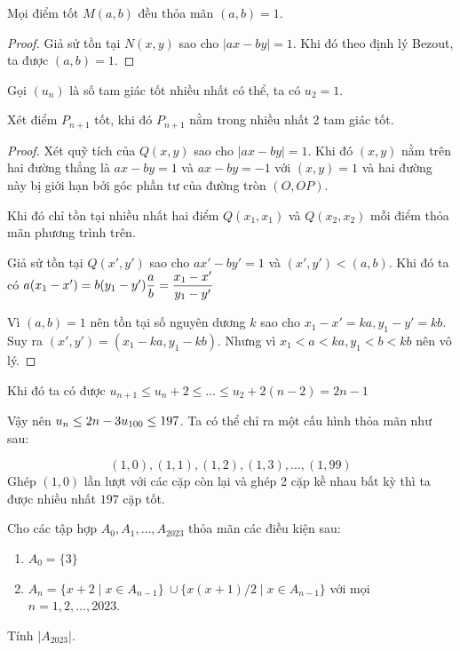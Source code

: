 \documentclass[11pt]{scrartcl}
\begin{document}
\begin{itemize}[label=, leftmargin=0em, itemsep=0.5em]
\begin{sol}
            Mọi điểm tốt $M(a,b)$ đều thỏa mãn $(a,b) =1$.

        \begin{proof}
            Giả sử tồn tại $N(x,y)$ sao cho $|ax - by| = 1$. Khi đó theo định lý Bezout, ta được $(a,b) = 1$.
        \end{proof}
        Gọi $(u_n)$ là số tam giác tốt nhiều nhất có thể, ta có $u_2 = 1$. 

        
         Xét điểm $P_{n + 1}$ tốt, khi đó $P_{n + 1}$ nằm trong nhiều nhất 2 tam giác tốt.

        \begin{proof}
            Xét quỹ tích của $Q(x,y)$ sao cho $|ax - by| = 1$. Khi đó $(x,y)$ nằm trên hai đường thẳng là $ax - by = 1$ và $ax - by = -1$ với $(x,y) = 1$ và hai đường này bị giới hạn bởi góc phần tư của đường tròn $(O,OP)$. 
            
            Khi đó chỉ tồn tại nhiều nhất hai điểm $Q(x_1,x_1)$ và $Q(x_2,x_2)$ mỗi điểm thỏa mãn phương trình trên. 

            Giả sử tồn tại $Q(x',y')$ sao cho $ax' - by' = 1$ và $(x',y') < (a,b)$. Khi đó ta có $a(x_1 - x') = b(y_1 - y') \lra \frac{a}{b} = \frac{x_1 - x'}{y_1 - y'}$

            Vì $(a,b) = 1$ nên tồn tại số nguyên dương $k$ sao cho $x_1 - x' = ka, y_1 - y' = kb$. Suy ra $(x',y') = (x_1 - ka, y_1 - kb)$. Nhưng vì $x_1 < a<  ka, y_1 < b< kb$ nên vô lý. 
        \end{proof}
        Khi đó ta có được $u_{n + 1} \leq u_n + 2 \leq \dots \leq u_2 + 2(n - 2)  = 2n - 1$

        Vậy nên $u_n \leq 2n - 3 \ra u_{100} \leq 197$. Ta có thể chỉ ra một cấu hình thỏa mãn như sau: 

        \[
            (1,0),(1,1),(1,2),(1,3),\dots,(1,99)
        \]
        Ghép $(1,0)$ lần lượt với các cặp còn lại và ghép 2 cặp kề nhau bất kỳ thì ta được nhiều nhất $197$ cặp tốt.
    \end{sol}
    \begin{bt}
        Cho các tập hợp $A_0, A_1, \dots, A_{2023}$ thỏa mãn các điều kiện sau:
        \begin{enumerate}
            \item $A_0 = \{ 3 \}$
            \item $A_n = \{ x + 2 \mid x \in A_{n -     1} \} \ \cup \{x(x+1) / 2 \mid x \in A_{n - 1} \}$ với mọi $n = 1, 2, \dots, 2023$.
        \end{enumerate}
    Tính $|A_{2023}|$.  
    \end{bt}


\end{itemize}
\end{document}
